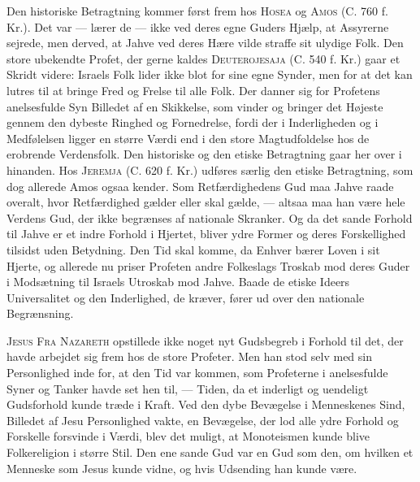 \documentclass[12pt,a4paper,openany]{book}
\newcommand{\opage}[1]{\marginnote{\footnotesize\textit{[#1]}}}
\begin{document}
Den historiske Betragtning kommer først frem hos \textsc{Hosea} og
\opage{103}\textsc{Amos} (C. 760 f. Kr.). Det var --- lærer de --- ikke
ved deres egne Guders Hjælp, at Assyrerne sejrede, men derved, at Jahve
ved deres Hære vilde straffe sit ulydige Folk. Den store ubekendte
Profet, der gerne kaldes \textsc{Deuterojesaja} (C. 540 f. Kr.) gaar et
Skridt videre: Israels Folk lider ikke blot for sine egne Synder, men
for at det kan lutres til at bringe Fred og Frelse til alle Folk. Der
danner sig for Profetens anelsesfulde Syn Billedet af en Skikkelse, som
vinder og bringer det Højeste gennem den dybeste Ringhed og Fornedrelse,
fordi der i Inderligheden og i Medfølelsen ligger en større Værdi end i
den store Magtudfoldelse hos de erobrende Verdensfolk. Den historiske og
den etiske Betragtning gaar her over i hinanden. Hos \textsc{Jeremja}
(C. 620 f. Kr.) udføres særlig den etiske Betragtning, som dog allerede
Amos ogsaa kender. Som Retfærdighedens Gud maa Jahve raade overalt, hvor
Retfærdighed gælder eller skal gælde, --- altsaa maa han være hele
Verdens Gud, der ikke begrænses af nationale Skranker. Og da det sande
Forhold til Jahve er et indre Forhold i Hjertet, bliver ydre Former og
deres Forskellighed tilsidst uden Betydning. Den Tid skal komme, da
Enhver bærer Loven i sit Hjerte, og allerede nu priser Profeten andre
Folkeslags Troskab mod deres Guder i Modsætning til Israels Utroskab mod
Jahve. Baade de etiske Ideers Universalitet og den Inderlighed, de
kræver, fører ud over den nationale Begrænsning.

\textsc{Jesus Fra Nazareth} opstillede ikke noget nyt Gudsbegreb i
Forhold til det, der havde arbejdet sig frem hos de store Profeter. Men
han stod selv med sin Personlighed inde for, at den Tid var kommen, som
Profeterne i anelsesfulde Syner og Tanker havde set hen til, --- Tiden,
da et inderligt og uendeligt Gudsforhold kunde træde i Kraft. Ved den
dybe Bevægelse i Menneskenes Sind, Billedet af Jesu Personlighed vakte,
en Bevægelse, der lod alle ydre Forhold og Forskelle forsvinde i Værdi,
blev det muligt, at Monoteismen kunde blive Folkereligion i større Stil.
Den ene sande Gud var en Gud som den, om hvilken et Menneske som Jesus
kunde vidne, og hvis Udsending han kunde være.
\end{document}
